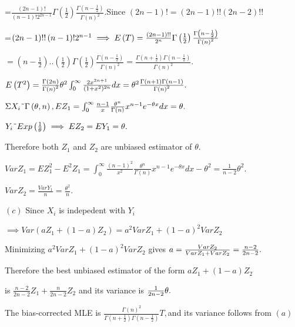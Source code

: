 \documentclass{article}
\begin{document}
=$\frac{\left( 2n-1\right) !}{\left( n-1\right) !2^{2n-1}}\Gamma \left( 
\frac{1}{2}\right) \frac{\Gamma \left( n-\frac{1}{2}\right) }{\Gamma \left(
n\right) ^{2}}.$Since $\left( 2n-1\right) !=\left( 2n-1\right) !!\left(
2n-2\right) !!$

=$\left( 2n-1\right) !!\left( n-1\right) !2^{n-1}\implies E\left( T\right) =%
\frac{\left( 2n-1\right) !!}{2^{n}}\Gamma \left( \frac{1}{2}\right) \frac{%
\Gamma \left( n-\frac{1}{2}\right) }{\Gamma \left( n\right) ^{2}}$

$=\left( n-\frac{1}{2}\right) ..\left( \frac{1}{2}\right) \Gamma \left( 
\frac{1}{2}\right) \frac{\Gamma \left( n-\frac{1}{2}\right) }{\Gamma \left(
n\right) ^{2}}=\frac{\Gamma \left( n+\frac{1}{2}\right) \Gamma \left( n-%
\frac{1}{2}\right) }{\Gamma \left( n\right) ^{2}}.$

$E\left( T^{2}\right) =\frac{\Gamma \left( 2n\right) }{\Gamma \left(
n\right) ^{2}}\theta ^{2}\int_{0}^{\infty }\frac{2x^{2n+1}}{(1+x^{2})^{2n}}%
dx=\theta ^{2}\frac{\Gamma \left( n+1\right) \Gamma \left( n-1\right) }{%
\Gamma \left( n\right) ^{2}}.$

$\Sigma X_{i}\symbol{126}\Gamma \left( \theta ,n\right)
,EZ_{1}=\int_{0}^{\infty }\frac{n-1}{x}\frac{\theta ^{n}}{\Gamma \left(
n\right) }x^{n-1}e^{-\theta x}dx=\theta .$

$Y_{i}\symbol{126}Exp\left( \frac{1}{\theta }\right) \implies
EZ_{2}=EY_{1}=\theta .$

Therefore both $Z_{1}$ and $Z_{2}$ are unbiased estimator of $\theta .$

$VarZ_{1}=EZ_{1}^{2}-E^{2}Z_{1}=\int_{0}^{\infty }\frac{\left( n-1\right)
^{2}}{x^{2}}\frac{\theta ^{n}}{\Gamma \left( n\right) }x^{n-1}e^{-\theta
x}dx-\theta ^{2}=\frac{1}{n-2}\theta ^{2}.$

$VarZ_{2}=\frac{VarY_{1}}{n}=\frac{\theta ^{2}}{n}.$

$\left( c\right) $ Since $X_{i}$ is indepedent with $Y_{i}$

$\implies Var\left( aZ_{1}+\left( 1-a\right) Z_{2}\right)
=a^{2}VarZ_{1}+\left( 1-a\right) ^{2}VarZ_{2}$

Minimizing $a^{2}VarZ_{1}+\left( 1-a\right) ^{2}VarZ_{2}$ gives $a=\frac{%
VarZ_{2}}{VarZ_{1}+VarZ_{2}}=\frac{n-2}{2n-2}.$

Therefore the best unbiased estimator of the form $aZ_{1}+\left( 1-a\right)
Z_{2}$

is $\frac{n-2}{2n-2}Z_{1}+\frac{n}{2n-2}Z_{2}$ and its variance is $\frac{1}{%
2n-2}\theta .$

The bias-corrected MLE is $\frac{\Gamma \left( n\right) ^{2}}{\Gamma \left(
n+\frac{1}{2}\right) \Gamma \left( n-\frac{1}{2}\right) }T,$and its variance
follows from $\left( a\right) $
\end{document}
